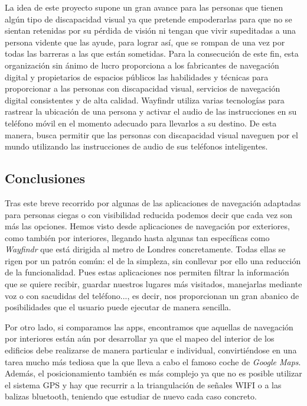 La idea de este proyecto supone un gran avance para las personas que tienen algún tipo de discapacidad visual ya que pretende empoderarlas para que no se sientan retenidas por su pérdida de visión ni tengan que vivir supeditadas a una persona vidente que las ayude, para lograr así, que se rompan de una vez por todas las barreras a las que están sometidas. Para la consecución de este fin, esta organización sin ánimo de lucro proporciona a los fabricantes de navegación digital y propietarios de espacios públicos las habilidades y técnicas para proporcionar a las personas con discapacidad visual, servicios de navegación digital consistentes y de alta calidad. Wayfindr utiliza varias tecnologías para rastrear la ubicación de una persona y activar el audio de las instrucciones en su teléfono móvil en el momento adecuado para llevarlos a su destino. De esta manera, busca permitir que las personas con discapacidad visual naveguen por el mundo utilizando las instrucciones de audio de sus teléfonos inteligentes.

\subsection{Conclusiones}
Tras este breve recorrido por algunas de las aplicaciones de navegación adaptadas para personas ciegas o con visibilidad reducida podemos decir que cada vez son más las opciones. Hemos visto desde aplicaciones de navegación por exteriores, como también por interiores, llegando hasta algunas tan específicas como \textit{Wayfindr} que está dirigida al metro de Londres concretamente. Todas ellas se rigen por un patrón común: el de la simpleza, sin conllevar por ello una reducción de la funcionalidad. Pues estas aplicaciones nos permiten filtrar la información que se quiere recibir, guardar nuestros lugares más visitados, manejarlas mediante voz o con sacudidas del teléfono..., es decir, nos proporcionan un gran abanico de posibilidades que el usuario puede ejecutar de manera sencilla.

Por otro lado, si comparamos las apps, encontramos que aquellas de navegación por interiores están aún por desarrollar ya que el mapeo del interior de los edificios debe realizarse de manera particular e individual, convirtiéndose en una tarea mucho más tediosa que la que lleva a cabo el famoso coche de \textit{Google Maps}. Además, el posicionamiento también es más complejo ya que no es posible utilizar el sistema GPS y hay que recurrir a la triangulación de señales WIFI o a las balizas bluetooth, teniendo que estudiar de nuevo cada caso concreto.


